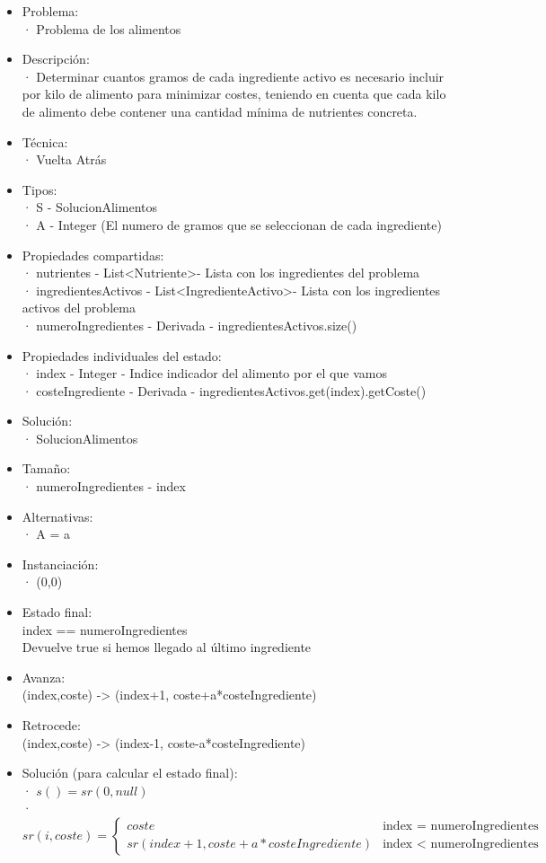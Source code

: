 \documentclass[a4paper,12pt]{article}
\begin{document}
\begin{itemize}

\item Problema: \\
      · Problema de los alimentos
\item Descripción: \\
· Determinar cuantos gramos de cada ingrediente activo es necesario incluir por kilo
de alimento para minimizar costes, teniendo en cuenta que cada kilo de alimento debe
contener una cantidad mínima de nutrientes concreta.
\item Técnica:\\
      · Vuelta Atrás
\item Tipos:\\
      · S - SolucionAlimentos\\
      · A - Integer \in [0,1000] (El numero de gramos que se seleccionan de cada ingrediente)
\item Propiedades compartidas:\\
      · nutrientes - List\textless Nutriente\textgreater - Lista con los ingredientes del problema\\
      · ingredientesActivos - List\textless IngredienteActivo\textgreater - Lista con los ingredientes activos del problema\\
      · numeroIngredientes - Derivada - ingredientesActivos.size()
\item Propiedades individuales del estado:\\
      · index - Integer - Indice indicador del alimento por el que vamos\\
      · costeIngrediente - Derivada - ingredientesActivos.get(index).getCoste()
\item Solución:\\
      · SolucionAlimentos
\item Tamaño:\\
      · numeroIngredientes - index
\item Alternativas:\\
      · A = {a \in [0,1000]}
\item Instanciación:\\
      · (0,0)
\item Estado final:\\
      index == numeroIngredientes \\Devuelve true si hemos llegado al último ingrediente
\item Avanza:\\
      (index,coste) -> (index+1, coste+a*costeIngrediente)
\item Retrocede:\\
      (index,coste) -> (index-1, coste-a*costeIngrediente)
\item Solución (para calcular el estado final):\\
      · $s() = sr(0,null)$\\
      · $sr(i, coste) =
      \begin{cases}
      coste  &\mbox{index = numeroIngredientes}\\
      sr(index+1, coste+a*costeIngrediente) &\mbox{index < numeroIngredientes}
      \end{cases}$


\end{itemize}
\end{document}
